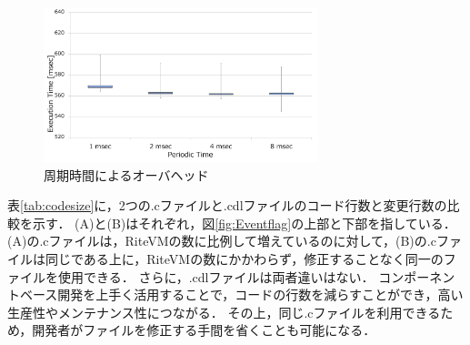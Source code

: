 \documentclass[submit,techrep]{ipsj}
\begin{document}

\begin{figure}[t]
    \centering
    \includegraphics[width=8cm,clip]{../EMSOFT2016/figure/comparison_msec.pdf}
    \caption{周期時間によるオーバヘッド}
\vspace{-2mm}
    \label{fig:comparison_msec}
\end{figure}

表\ref{tab:codesize}に，2つの.cファイルと.cdlファイルのコード行数と変更行数の比較を示す．
(A)と(B)はそれぞれ，図\ref{fig:Eventflag}の上部と下部を指している．
(A)の.cファイルは，RiteVMの数に比例して増えているのに対して，(B)の.cファイルは同じである上に，RiteVMの数にかかわらず，修正することなく同一のファイルを使用できる．
さらに，.cdlファイルは両者違いはない．
コンポーネントベース開発を上手く活用することで，コードの行数を減らすことができ，高い生産性やメンテナンス性につながる．
その上，同じ.cファイルを利用できるため，開発者がファイルを修正する手間を省くことも可能になる．

\end{document}
